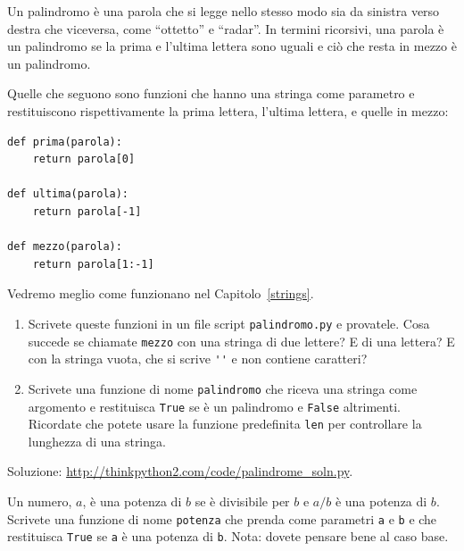 \documentclass[10pt]{book}
\begin{document}
\vspace{0.2in}
\begin{exercise}
\label{palindrome}

Un palindromo è una parola che si legge nello stesso modo sia da sinistra verso destra che viceversa, come ``ottetto'' e ``radar''. In termini ricorsivi, una parola è un palindromo se la prima e l'ultima lettera sono uguali e ciò che resta in mezzo è un palindromo.

Quelle che seguono sono funzioni che hanno una stringa come parametro e restituiscono rispettivamente la prima lettera, l'ultima lettera, e quelle in mezzo:

\begin{verbatim}
def prima(parola):
    return parola[0]

def ultima(parola):
    return parola[-1]

def mezzo(parola):
    return parola[1:-1]
\end{verbatim}
%
Vedremo meglio come funzionano nel Capitolo~\ref{strings}.

\begin{enumerate}

\item Scrivete queste funzioni in un file script {\tt palindromo.py}
e provatele. Cosa succede se chiamate {\tt mezzo} con una stringa di due lettere?  E di una lettera?  E con la stringa vuota, che si scrive \verb"''" e non contiene caratteri?

\item Scrivete una funzione di nome \verb"palindromo" che riceva una stringa come argomento e restituisca {\tt True} se è un palindromo e {\tt False} altrimenti. Ricordate che potete usare la funzione predefinita {\tt len} per controllare la lunghezza di una stringa.

\end{enumerate}

Soluzione: \url{http://thinkpython2.com/code/palindrome_soln.py}.

\end{exercise}

\vspace{0.2in}
\begin{exercise}

Un numero, $a$, è una potenza di $b$ se è divisibile per $b$
e $a/b$ è una potenza di $b$.  Scrivete una funzione di nome
\verb"potenza" che prenda come parametri {\tt a} e {\tt b}
e che restituisca {\tt True} se {\tt a} è una potenza di {\tt b}.
Nota: dovete pensare bene al caso base.

\end{exercise}
\end{document}
